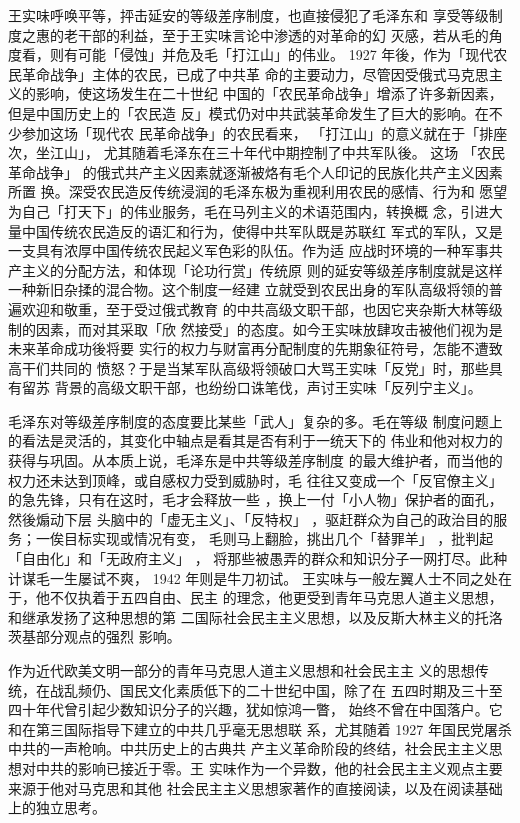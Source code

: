 王实味呼唤平等，抨击延安的等级差序制度，也直接侵犯了毛泽东和
享受等级制度之惠的老干部的利益，至于王实味言论中渗透的对革命的幻
灭感，若从毛的角度看，则有可能「侵蚀」并危及毛「打江山」的伟业。
1927 年後，作为「现代农民革命战争」主体的农民，已成了中共革
命的主要动力，尽管因受俄式马克思主义的影响，使这场发生在二十世纪
中国的「农民革命战争」增添了许多新因素，但是中国历史上的「农民造
反」模式仍对中共武装革命发生了巨大的影响。在不少参加这场「现代农
民革命战争」的农民看来，
「打江山」的意义就在于「排座次，坐江山」，
尤其随着毛泽东在三十年代中期控制了中共军队後。
这场
「农民革命战争」
的俄式共产主义因素就逐渐被烙有毛个人印记的民族化共产主义因素所置
换。深受农民造反传统浸润的毛泽东极为重视利用农民的感情、行为和
愿望为自己「打天下」的伟业服务，毛在马列主义的术语范围内，转换概
念，引进大量中国传统农民造反的语汇和行为，使得中共军队既是苏联红
军式的军队，又是一支具有浓厚中国传统农民起义军色彩的队伍。作为适
应战时环境的一种军事共产主义的分配方法，和体现「论功行赏」传统原
则的延安等级差序制度就是这样一种新旧杂揉的混合物。这个制度一经建
立就受到农民出身的军队高级将领的普遍欢迎和敬重，至于受过俄式教育
的中共高级文职干部，也因它夹杂斯大林等级制的因素，而对其采取「欣
然接受」的态度。如今王实味放肆攻击被他们视为是未来革命成功後将要
实行的权力与财富再分配制度的先期象征符号，怎能不遭致高干们共同的
愤怒？于是当某军队高级将领破口大骂王实味「反党」时，那些具有留苏
背景的高级文职干部，也纷纷口诛笔伐，声讨王实味「反列宁主义」。

毛泽东对等级差序制度的态度要比某些「武人」复杂的多。毛在等级
制度问题上的看法是灵活的，其变化中轴点是看其是否有利于一统天下的
伟业和他对权力的获得与巩固。从本质上说，毛泽东是中共等级差序制度
的最大维护者，而当他的权力还未达到顶峰，或自感权力受到威胁时，毛
往往又变成一个「反官僚主义」的急先锋，只有在这时，毛才会释放一些
，换上一付「小人物」保护者的面孔，然後煽动下层
头脑中的「虚无主义」、「反特权」
，驱赶群众为自己的政治目的服务；一俟目标实现或情况有变，
毛则马上翻脸，挑出几个「替罪羊」
，批判起「自由化」和「无政府主义」
，
将那些被愚弄的群众和知识分子一网打尽。此种计谋毛一生屡试不爽，
1942 年则是牛刀初试。
王实味与一般左翼人士不同之处在于，他不仅执着于五四自由、民主
的理念，他更受到青年马克思人道主义思想，和继承发扬了这种思想的第
二国际社会民主主义思想，以及反斯大林主义的托洛茨基部分观点的强烈
影响。

作为近代欧美文明一部分的青年马克思人道主义思想和社会民主主
义的思想传统，在战乱频仍、国民文化素质低下的二十世纪中国，除了在
五四时期及三十至四十年代曾引起少数知识分子的兴趣，犹如惊鸿一瞥，
始终不曾在中国落户。它和在第三国际指导下建立的中共几乎毫无思想联
系，尤其随着 1927 年国民党屠杀中共的一声枪响。中共历史上的古典共
产主义革命阶段的终结，社会民主主义思想对中共的影响已接近于零。王
实味作为一个异数，他的社会民主主义观点主要来源于他对马克思和其他
社会民主主义思想家著作的直接阅读，以及在阅读基础上的独立思考。

